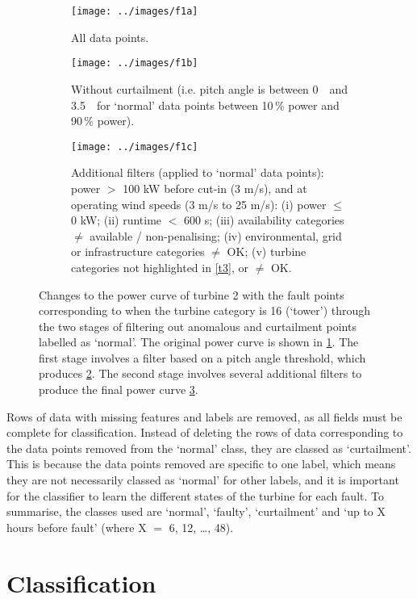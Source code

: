 \begin{figure}
  \centering
  \begin{subfigure}[t]{.5\textwidth}
    \centering
    \texttt{[image: ../images/f1a]}
    \caption{\label{f1a}All data points.}
  \end{subfigure}%
  \begin{subfigure}[t]{.5\textwidth}
    \centering
    \texttt{[image: ../images/f1b]}
    \caption{\label{f1b}Without curtailment (i.e. pitch angle is between
    0\,\textdegree~ and 3.5\,\textdegree~ for `normal' data points between
    10\,\% power and 90\,\% power).}
  \end{subfigure}
  \begin{subfigure}[t]{.5\textwidth}
    \centering
    \texttt{[image: ../images/f1c]}
    \caption{\label{f1c}
      Additional filters (applied to `normal' data points): power $>$ 100 kW
      before cut-in (3 m/s), and at operating wind speeds (3 m/s to 25 m/s):
      (i) power $\leq$ 0 kW; (ii) runtime $<$ 600 s; (iii) availability
      categories $\neq$ available / non-penalising; (iv) environmental, grid
      or infrastructure categories $\neq$ OK; (v) turbine categories not
      highlighted in \autoref{t3}, or $\neq$ OK.
    }
  \end{subfigure}
  \caption{\label{f1}Changes to the power curve of turbine 2 with the fault
  points corresponding to when the turbine category is 16 (`tower') through
  the two stages of filtering out anomalous and curtailment points labelled as
  `normal'. The original power curve is shown in \ref{f1a}. The first stage
  involves a filter based on a pitch angle threshold, which produces
  \ref{f1b}. The second stage involves several additional filters to produce
  the final power curve \ref{f1c}.}
\end{figure}

Rows of data with missing features and labels are removed, as all fields must
be complete for classification. Instead of deleting the rows of data
corresponding to the data points removed from the `normal' class, they are
classed as `curtailment'. This is because the data points removed are specific
to one label, which means they are not necessarily classed as `normal' for
other labels, and it is important for the classifier to learn the different
states of the turbine for each fault. To summarise, the classes used are
`normal', `faulty', `curtailment' and `up to X hours before fault' (where X
$=$ 6, 12, \dots, 48). 

\section{Classification}

